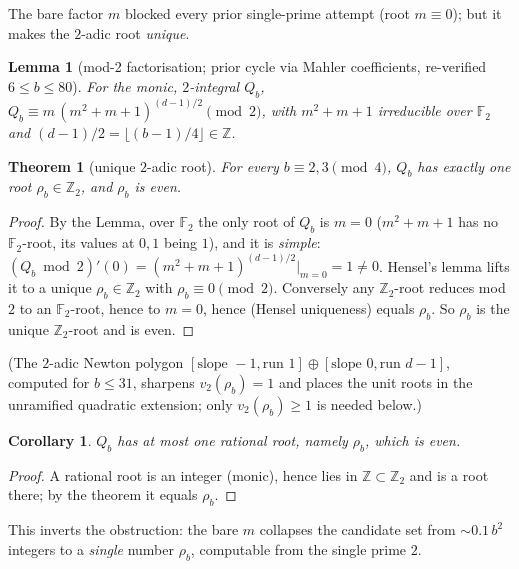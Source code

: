 \documentclass[11pt]{article}
\newtheorem{theorem}{Theorem}
\newtheorem{lemma}{Lemma}
\newtheorem{corollary}{Corollary}
\theoremstyle{definition}
\newcommand{\Z}{\mathbb{Z}}
\newcommand{\F}{\mathbb{F}}
\begin{document}
The bare factor $m$ blocked every prior single-prime attempt (root $m\equiv0$); but it makes the
$2$-adic root \emph{unique}.

\begin{lemma}[mod-2 factorisation; prior cycle via Mahler coefficients, re-verified $6\le b\le80$]
For the monic, $2$-integral $Q_b$, \ $Q_b\equiv m\,(m^2+m+1)^{(d-1)/2}\pmod2$, with $m^2+m+1$
irreducible over $\F_2$ and $(d-1)/2=\lfloor(b-1)/4\rfloor\in\Z$.
\end{lemma}

\begin{theorem}[unique $2$-adic root]
For every $b\equiv2,3\pmod4$, $Q_b$ has exactly one root $\rho_b\in\Z_2$, and $\rho_b$ is even.
\end{theorem}
\begin{proof}
By the Lemma, over $\F_2$ the only root of $Q_b$ is $m=0$ ($m^2+m+1$ has no $\F_2$-root, its values
at $0,1$ being $1$), and it is \emph{simple}: $(Q_b\bmod2)'(0)=(m^2+m+1)^{(d-1)/2}|_{m=0}=1\ne0$.
Hensel's lemma lifts it to a unique $\rho_b\in\Z_2$ with $\rho_b\equiv0\pmod2$. Conversely any
$\Z_2$-root reduces mod $2$ to an $\F_2$-root, hence to $m=0$, hence (Hensel uniqueness) equals
$\rho_b$. So $\rho_b$ is the unique $\Z_2$-root and is even.
\end{proof}

\noindent (The $2$-adic Newton polygon $[\text{slope }-1,\text{run }1]\oplus[\text{slope }0,
\text{run }d-1]$, computed for $b\le31$, sharpens $v_2(\rho_b)=1$ and places the unit roots in the
unramified quadratic extension; only $v_2(\rho_b)\ge1$ is needed below.)

\begin{corollary}
$Q_b$ has at most one rational root, namely $\rho_b$, which is even.
\end{corollary}
\begin{proof}
A rational root is an integer (monic), hence lies in $\Z\subset\Z_2$ and is a root there; by the
theorem it equals $\rho_b$.
\end{proof}

This inverts the obstruction: the bare $m$ collapses the candidate set from $\sim0.1\,b^2$ integers
to a \emph{single} number $\rho_b$, computable from the single prime $2$.
\end{document}
